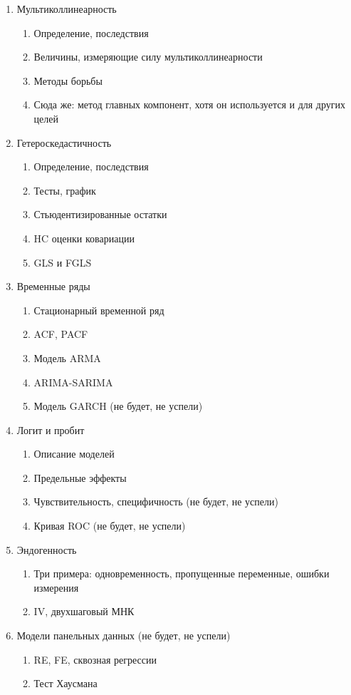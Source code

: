\documentclass[12pt, a4paper]{article}
\begin{document}
\begin{enumerate}
\item Мультиколлинеарность
\begin{enumerate}
\item Определение, последствия
\item Величины, измеряющие силу мультиколлинеарности
\item Методы борьбы
\item Сюда же: метод главных компонент, хотя он используется и для других целей
\end{enumerate}


\item Гетероскедастичность
\begin{enumerate}
\item Определение, последствия
\item Тесты, график
\item Стьюдентизированные остатки
\item HC оценки ковариации
\item GLS и FGLS
\end{enumerate}

\item Временные ряды
\begin{enumerate}
\item Стационарный временной ряд
\item ACF, PACF
\item Модель ARMA
\item ARIMA-SARIMA
\item Модель GARCH (не будет, не успели)
\end{enumerate}


\item Логит и пробит
\begin{enumerate}
\item Описание моделей
\item Предельные эффекты
\item Чувствительность, специфичность (не будет, не успели)
\item Кривая ROC (не будет, не успели)
\end{enumerate}

\item Эндогенность
\begin{enumerate}
\item Три примера: одновременность, пропущенные переменные, ошибки измерения
\item IV, двухшаговый МНК
\end{enumerate}


\item Модели панельных данных (не будет, не успели)
\begin{enumerate}
\item  RE, FE, сквозная регрессии
\item  Тест Хаусмана
\end{enumerate}


\end{enumerate}
\end{document}
